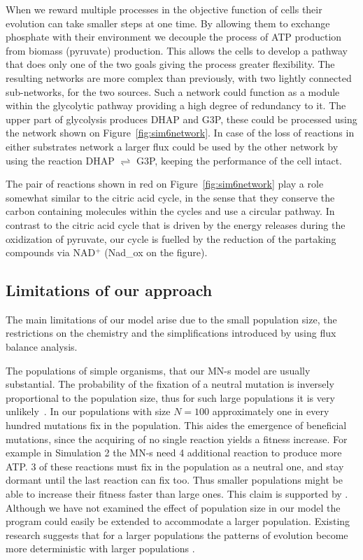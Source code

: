 \documentclass[a4paper,12pt]{article}
\begin{document}
When we reward multiple processes in the objective function of cells their evolution can take smaller steps at one time. By allowing them to exchange phosphate with their environment we decouple the process of ATP production from biomass (pyruvate) production. This allows the cells to develop a pathway that does only one of the two goals giving the process greater flexibility. The resulting networks are more complex than previously, with two lightly connected sub-networks, for the two sources. Such a network could function as a module within the glycolytic pathway providing a high degree of redundancy to it. The upper part of glycolysis produces DHAP and G3P, these could be processed using the network shown on Figure~\ref{fig:sim6network}. In case of the loss of reactions in either substrates network a larger flux could be used by the other network by using the reaction DHAP $\rightleftharpoons$ G3P, keeping the performance of the cell intact. 

The pair of reactions shown in red on Figure~\ref{fig:sim6network} play a role somewhat similar to the 
citric acid cycle, in the sense that they conserve the carbon containing molecules within the cycles and use a circular pathway. In contrast to the citric acid cycle that is driven by the energy releases during the oxidization of pyruvate, our cycle is fuelled by the reduction of the partaking compounds via NAD$^+$ (Nad\_ox on the figure). 

\subsection*{Limitations of our approach}
\label{sub:limitations}


The main limitations of our model arise due to the small population size, the restrictions on the chemistry and the simplifications introduced by using flux balance analysis. 

The populations of simple organisms, that our MN-s model are usually substantial. The probability of the fixation of a neutral mutation is inversely proportional to the population size, thus for such large populations it is very unlikely~\cite{barteklecture}. In our populations with size $N=100$ approximately one in every hundred mutations fix in the population. This aides the emergence of beneficial mutations, since the acquiring of no single reaction yields a fitness increase. For example in Simulation 2 the MN-s need 4 additional reaction to produce more ATP. $3$ of these reactions must fix in the population as a neutral one, and stay dormant until the last reaction can fix too. Thus smaller populations might be able to increase their fitness faster than large ones. This claim is supported by \cite{smallpopulation}. 
Although we have not examined the effect of population size in our model the program could easily be extended to accommodate a larger population. Existing research suggests that for a larger populations the patterns of evolution become more deterministic with larger populations \cite{predictability}.
\end{document}
